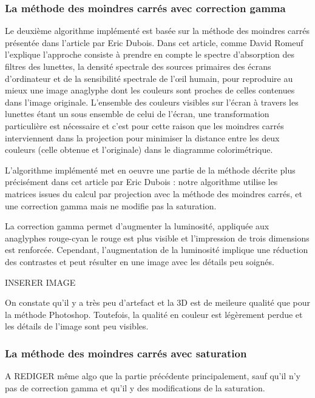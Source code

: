 \subsubsection{La méthode des moindres carrés avec correction gamma}
	Le deuxième algorithme implémenté est basée sur la méthode des moindres carrés présentée dans l'article \cite{algoDubois} par Eric Dubois. Dans cet article, comme David Romeuf l'explique \cite{explicationAlgoDubois} l'approche consiste à prendre en compte le spectre d'absorption des filtres des lunettes, la densité spectrale des sources primaires des écrans d'ordinateur et de la sensibilité spectrale de l'œil humain, pour reproduire au mieux une image anaglyphe dont les couleurs sont proches de celles contenues dans l'image originale. L'ensemble des couleurs visibles sur l'écran à travers les lunettes étant un sous ensemble de celui de l'écran, une transformation particulière est nécessaire et c'est pour cette raison que les moindres carrés interviennent dans la projection pour minimiser la distance entre les deux couleurs (celle obtenue et l'originale) dans le diagramme colorimétrique.
	
	L'algorithme implémenté met en oeuvre une partie de la méthode décrite plus précisément dans cet article par Eric Dubois \cite{algoMoindreCarres} : notre algorithme utilise les matrices issues du calcul par projection avec la méthode des moindres carrés, et une correction gamma mais ne modifie pas la saturation.
	
	La correction gamma permet d'augmenter la luminosité, appliquée aux anaglyphes rouge-cyan le rouge est plus visible et l'impression de trois dimensions est renforcée. Cependant, l'augmentation de la luminosité implique une réduction des contrastes et peut résulter en une image avec les détails peu soignés.

	INSERER IMAGE
	
	On constate qu'il y a très peu d'artefact et la 3D est de meileure qualité que pour la méthode Photoshop. Toutefois, la qualité en couleur est légèrement perdue et les détails de l'image sont peu visibles. 
	

\subsubsection{La méthode des moindres carrés avec saturation}


A REDIGER
même algo que la partie précédente principalement, sauf qu'il n'y pas de correction gamma et qu'il y des modifications de la saturation.


